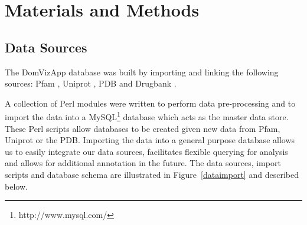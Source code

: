 \section{Materials and Methods}


% 


\subsection{Data Sources}

The DomVizApp database was built by importing and linking the following sources: Pfam \cite{pfamdb}, Uniprot \cite{uniprot}, PDB \cite{pdb} and Drugbank \cite{drugbank}.

A collection of Perl modules were written to perform data pre-processing and to import the data into a MySQL\footnote{http://www.mysql.com/} database which acts as the master data store. These Perl scripts allow databases to be created given new data from Pfam, Uniprot or the PDB. Importing the data into a general purpose database allows us to easily integrate our data sources, facilitates flexible querying for analysis and allows for additional annotation in the future. The data sources, import scripts and database schema are illustrated in Figure~\ref{dataimport} and described below.  

